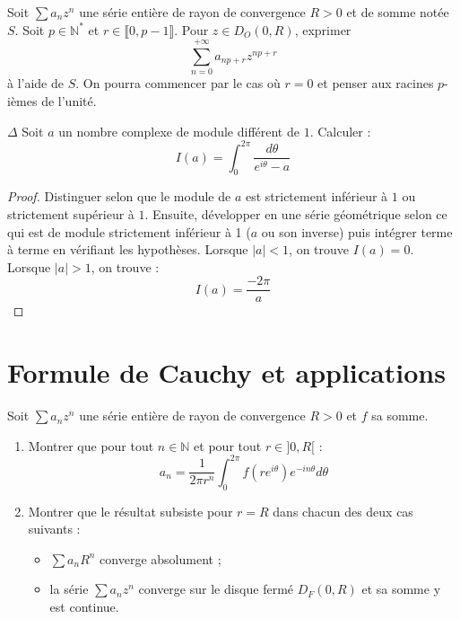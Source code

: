 \documentclass[french,a4paper]{article}
\newcommand{\N}{\mathbb{N}}
\newcommand{\st}{^*}
\theoremstyle{plain}
\theoremstyle{definition}
\theoremstyle{remark}
\begin{document}
\begin{ex}[Moulin.SE.29]{}
	Soit $\displaystyle\sum a_nz^n$ une série entière de rayon de convergence $R>0$ et de somme notée $S$. Soit $p\in\N\st$ et $r\in\llbracket0,p-1\rrbracket$. Pour $z\in D_O(0,R)$, exprimer $$\sum_{n=0}^{+\infty}a_{np+r}z^{np+r}$$ à l'aide de $S$. On pourra commencer par le cas où $r=0$ et penser aux racines $p$-ièmes de l'unité.
\end{ex}

\begin{ex}[Moulin.SE.30]{$\Delta$}
	Soit $a$ un nombre complexe de module différent de $1$. Calculer : $$I(a)=\int_{0}^{2\pi}\frac{d\theta}{e^{i\theta}-a}$$
\end{ex}
\begin{proof}
	Distinguer selon que le module de $a$ est strictement inférieur à $1$ ou strictement supérieur à $1$. Ensuite, développer en une série géométrique selon ce qui est de module strictement inférieur à 1 ($a$ ou son inverse) puis intégrer terme à terme en vérifiant les hypothèses. Lorsque $\lvert a\rvert <1$, on trouve $I(a)=0$. Lorsque $\lvert a\rvert >1$, on trouve : $$I(a)=\frac{-2\pi}{a}$$
\end{proof}

\section{Formule de Cauchy et applications}

\begin{ex}[Moulin.SE.31]{}
	Soit $\displaystyle\sum a_nz^n$ une série entière de rayon de convergence $R>0$ et $f$ sa somme.
	\begin{enumerate}
		\item Montrer que pour tout $n\in\N$ et pour tout $r\in]0,R[$ : $$a_n=\frac{1}{2\pi r^n}\int_{0}^{2\pi}f(re^{i\theta})e^{-in\theta}d\theta$$
		\item Montrer que le résultat subsiste pour $r=R$ dans chacun des deux cas suivants : 
		\begin{itemize}
			\item $\displaystyle\sum a_n R^n$ converge absolument ;
			\item la série $\displaystyle\sum a_nz^n$ converge sur le disque fermé $D_F(0,R)$ et sa somme y est continue.
		\end{itemize}
	\end{enumerate}
\end{ex}
\end{document}
